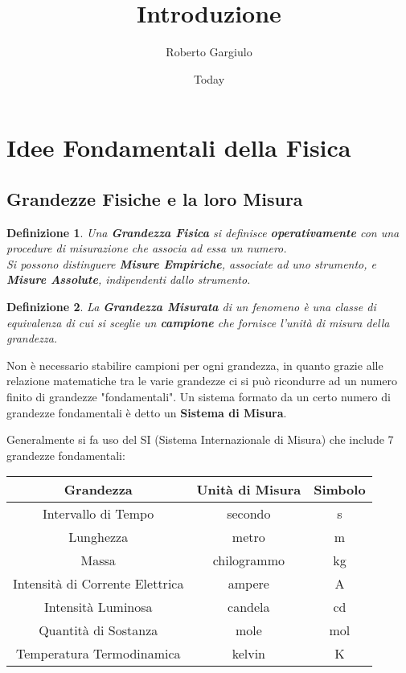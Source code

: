 \documentclass{article}
\title{Introduzione}
\author{Roberto Gargiulo}
\date{Today}
\newtheorem{defn}{Definizione}[section]
\newcommand{\note}{\noindent {\quad \bf \underline{Osservazione:}} \quad}
\begin{document}
\maketitle
\tableofcontents
\pagebreak


\section{Idee Fondamentali della Fisica}

\subsection{Grandezze Fisiche e la loro Misura}

\begin{defn}
Una \textbf{Grandezza Fisica} si definisce \textbf{operativamente} con una procedure di misurazione che associa ad essa un numero. \\
Si possono distinguere \textbf{Misure Empiriche}, associate ad uno strumento, e \textbf{Misure Assolute}, indipendenti dallo strumento. 
\end{defn}

\begin{defn}
La \textbf{Grandezza Misurata} di un fenomeno è una classe di equivalenza di cui si sceglie un \textbf{campione} che fornisce l'unità di misura della grandezza.
\end{defn}
\note Non è necessario stabilire campioni per ogni grandezza, in quanto grazie alle relazione matematiche tra le varie grandezze ci si può ricondurre ad un numero finito di grandezze "fondamentali". Un sistema formato da un certo numero di grandezze fondamentali è detto un \textbf{Sistema di Misura}.

Generalmente si fa uso del SI (Sistema Internazionale di Misura) che include 7 grandezze fondamentali:
\begin{center}
\begin{tabular}{ |c|c|c| }
\hline
Grandezza & Unità di Misura & Simbolo\\
\hline
Intervallo di Tempo & secondo & s\\
Lunghezza & metro & m\\
Massa & chilogrammo	& kg\\
Intensità di Corrente Elettrica	& ampere & A\\
Intensità Luminosa	& candela &	cd\\
Quantità di Sostanza & mole & mol\\
Temperatura Termodinamica &	kelvin & K\\
\hline
\end{tabular}
\end{center}
\end{document}
